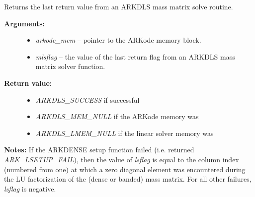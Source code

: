 \documentclass[letterpaper,10pt,english]{sphinxmanual}
\begin{document}
\begin{fulllineitems}
\label{c_interface/User_callable:ARKDlsGetLastMassFlag}
Returns the last return value from an ARKDLS mass matrix solve routine.
\begin{description}
\item[{\textbf{Arguments:}}] \leavevmode\begin{itemize}
\item {} 
\emph{arkode\_mem} -- pointer to the ARKode memory block.

\item {} 
\emph{mlsflag} -- the value of the last return flag from an ARKDLS
mass matrix solver function.

\end{itemize}

\item[{\textbf{Return value:}}] \leavevmode\begin{itemize}
\item {} 
\emph{ARKDLS\_SUCCESS} if successful

\item {} 
\emph{ARKDLS\_MEM\_NULL} if the ARKode memory was 

\item {} 
\emph{ARKDLS\_LMEM\_NULL} if the linear solver memory was 

\end{itemize}

\end{description}

\textbf{Notes:} If the ARKDENSE setup function failed
(i.e. {\hyperref[c_interface/User_callable:ARKode]{}} returned \emph{ARK\_LSETUP\_FAIL}), then the
value of \emph{lsflag} is equal to the column index (numbered from
one) at which a zero diagonal element was encountered during the LU
factorization of the (dense or banded) mass matrix.  For all
other failures, \emph{lsflag} is negative.

\end{fulllineitems}

\end{document}
